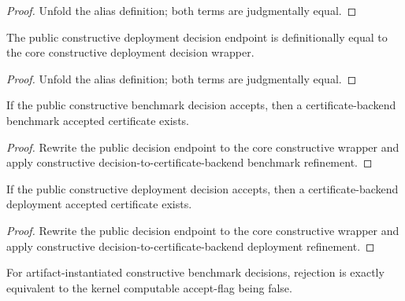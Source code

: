 \begin{proof}
Unfold the alias definition; both terms are judgmentally equal.
\end{proof}

\begin{theorem}
\label{thm:definitive-deployment-decision-alias-exactness}
The public constructive deployment decision endpoint is definitionally equal to the core constructive deployment decision wrapper.
\end{theorem}

\begin{proof}
Unfold the alias definition; both terms are judgmentally equal.
\end{proof}

\begin{theorem}
\label{thm:definitive-benchmark-decision-refines-certificate-backend-benchmark}
If the public constructive benchmark decision accepts, then a certificate-backend benchmark accepted certificate exists.
\end{theorem}

\begin{proof}
Rewrite the public decision endpoint to the core constructive wrapper and apply constructive decision-to-certificate-backend benchmark refinement.
\end{proof}

\begin{theorem}
\label{thm:definitive-decision-refines-certificate-backend-deployment}
If the public constructive deployment decision accepts, then a certificate-backend deployment accepted certificate exists.
\end{theorem}

\begin{proof}
Rewrite the public decision endpoint to the core constructive wrapper and apply constructive decision-to-certificate-backend deployment refinement.
\end{proof}

\begin{theorem}
\label{thm:definitive-benchmark-decision-rejected-iff-kernel-flag-false}
For artifact-instantiated constructive benchmark decisions, rejection is exactly equivalent to the kernel computable accept-flag being false.
\end{theorem}

